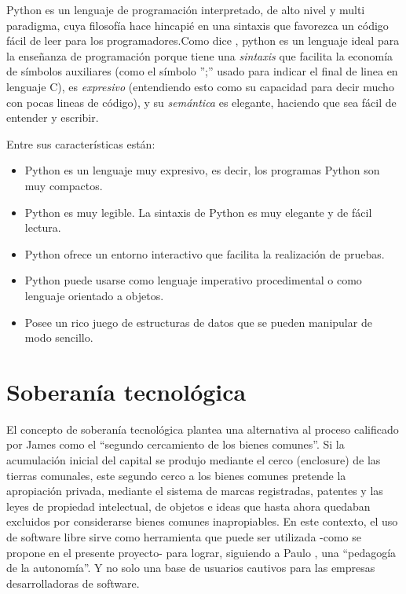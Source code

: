 Python es un lenguaje de programación interpretado, de alto nivel y multi paradigma, cuya filosofía hace hincapié en una sintaxis que favorezca un código fácil de leer para los programadores.Como dice \cite{marzal2003aprender}, python es un lenguaje ideal para la enseñanza de programación porque tiene una \textit{sintaxis} que facilita la economía de símbolos auxiliares (como el símbolo '';'' usado para indicar el final de linea en lenguaje C), es \textit{expresivo} (entendiendo esto como su capacidad para decir mucho con pocas lineas de código), y su \textit{semántica} es elegante, haciendo que sea fácil de entender y escribir.

Entre sus características \citep[pág 15]{marzal2004introduccion} están: 

\begin{itemize}
  \item Python es un lenguaje muy expresivo, es decir, los programas Python son muy compactos.
  \item Python es muy legible. La sintaxis de Python es muy elegante y de fácil lectura.
  \item Python ofrece un entorno interactivo que facilita la realización de pruebas.
  \item Python puede usarse como lenguaje imperativo procedimental o como lenguaje orientado a objetos.
  \item Posee un rico juego de estructuras de datos que se pueden manipular de modo sencillo.
 
\end{itemize}

\section{Soberanía tecnológica}

El concepto de soberanía tecnológica plantea una alternativa al proceso calificado por James \citet{boyle_second_2003} como el “segundo cercamiento de los bienes comunes”. Si la acumulación inicial del capital se produjo mediante el cerco (enclosure) de las tierras comunales, este segundo cerco a los bienes comunes pretende la apropiación privada, mediante el sistema de marcas registradas, patentes y las leyes de propiedad intelectual, de objetos e ideas que hasta ahora quedaban excluidos por considerarse bienes comunes inapropiables. En este contexto, el uso de software libre sirve como herramienta que puede ser utilizada -como se propone en el presente proyecto- para lograr, siguiendo a Paulo \citet{freire_pedagogiautonomi:_2006}, una “pedagogía de la autonomía”. Y no solo una base de usuarios cautivos para las empresas desarrolladoras de software. 

